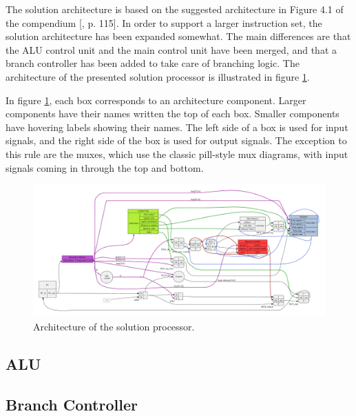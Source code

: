 The solution architecture is based on the suggested architecture in Figure 4.1 of the compendium [\cite{compendium}, p. 115].
In order to support a larger instruction set, the solution architecture has been expanded somewhat.
The main differences are that the ALU control unit and the main control unit have been merged, and that a branch controller has been added to take care of branching logic.
The architecture of the presented solution processor is illustrated in figure \ref{figure:cpu-architecture}.

In figure \ref{figure:cpu-architecture}, each box corresponds to an architecture component.
Larger components have their names written the top of each box.
Smaller components have hovering labels showing their names.
The left side of a box is used for input signals, and the right side of the box is used for output signals.
The exception to this rule are the muxes, which use the classic pill-style mux diagrams, with input signals coming in through the top and bottom.

\begin{figure}[h!]
	\begin{center}
		\includegraphics[keepaspectratio, height=\textheight, width=\textwidth]{graphics/cpu-architecture/cpu-architecture-color.pdf}
		\caption{Architecture of the solution processor.}
		\label{figure:cpu-architecture}
	\end{center}
\end{figure}

\subsection{ALU}



\subsection{Branch Controller}

